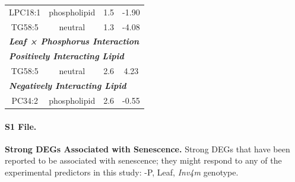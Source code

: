 \documentclass[9pt,twocolumn,twoside]{rilabRxiv}
\newcommand{\invfour}{\textit{Inv4m}\xspace}
\begin{document}
\begin{table}[h!]
\begin{tabular}{cccc}
LPC18:1 & phospholipid & 1.5 & -1.90\\
TG58:5 & neutral & 1.3 & -4.08\\
\hline
\multicolumn{4}{l}{\textit{\textbf{Leaf × Phosphorus Interaction}}} \\
\hline
\multicolumn{4}{l}{\textit{\textbf{Positively Interacting Lipid}}} \\
\hline
TG58:5 & neutral & 2.6 & 4.23\\
\hline
\multicolumn{4}{l}{\textit{\textbf{Negatively Interacting Lipid}}} \\
\hline
PC34:2 & phospholipid & 2.6 & -0.55\\
\hline
\end{tabular}
\end{table}

\clearpage


\paragraph*{S1 File.}
\makeatletter
\def\@currentlabelname{S1 File.}
\makeatother
\label{S1_File}
\textbf{Strong DEGs Associated with Senescence.} Strong DEGs that have been reported to be associated with senescence; they might respond to any of the experimental predictors in this study: -P, Leaf, \invfour genotype.
\end{document}
